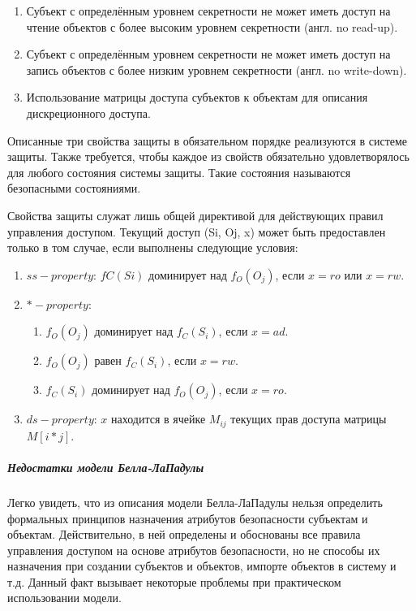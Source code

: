 \begin{enumerate}
    \item Субъект с определённым уровнем секретности не может иметь доступ на чтение объектов с более высоким уровнем секретности (англ. no read-up).
    \item Субъект с определённым уровнем секретности не может иметь доступ на запись объектов с более низким уровнем секретности (англ. no write-down).
    \item Использование матрицы доступа субъектов к объектам для описания дискреционного доступа.
\end{enumerate}

Описанные три свойства защиты в обязательном порядке реализуются в системе защиты. Также требуется, чтобы каждое из свойств обязательно удовлетворялось для любого состояния системы защиты. Такие состояния называются безопасными состояниями. 

Свойства защиты служат лишь общей директивой для действующих правил управления доступом. Текущий доступ (Si, Oj, x) может быть предоставлен только в том случае, если выполнены следующие условия: 

\begin{enumerate}
	\item $ss-property$: $fC(Si)$ доминирует над $f_O(O_j)$, если $x = ro$ или $x = rw$.
	\item $*-property$:
	\begin{enumerate}
		\item $f_O (O_j)$ доминирует над $f_C(S_i)$, если $x = ad$.
		\item $f_O(O_j)$ равен $f_C(S_i)$, если $x = rw$.
		\item $f_C(S_i)$ доминирует над $f_O(O_j)$, если $x = ro$.
	\end{enumerate}
	\item $ds-property$: $x$ находится в ячейке $M_{ij}$ текущих прав доступа матрицы $M[i*j]$. 
\end{enumerate}

\subparagraph{Недостатки модели Белла-ЛаПадулы}

Легко увидеть, что из описания модели Белла-ЛаПадулы нельзя определить формальных принципов назначения атрибутов безопасности субъектам и объектам. Действительно, в ней определены и обоснованы все правила управления доступом на основе атрибутов безопасности, но не способы их назначения при создании субъектов и объектов, импорте объектов в систему и т.д. Данный факт вызывает некоторые проблемы при практическом использовании модели. 

